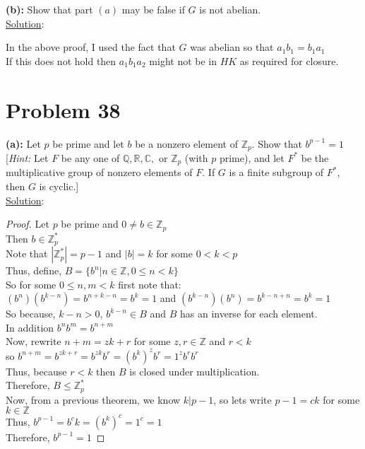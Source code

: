 \documentclass{article} %
\begin{document}
\textbf{(b): } Show that part $(a)$ may be false if $G$ is not abelian.
\\

\underline{Solution}: 
\begin{addmargin}[1em]{0em}
In the above proof, I used the fact that $G$ was abelian so that $a_1b_1 = b_1a_1$
\\If this does not hold then $a_1b_1a_2$ might not be in $HK$ as required for closure.
\end{addmargin} 

\newpage
\section*{Problem 38}


\textbf{(a): } Let $p$ be prime and let $b$ be a nonzero element of $\mathbb{Z}_p$.  Show that $b^{p-1} = 1$ [\textit{Hint:} Let $F$ be any one of $\mathbb{Q}, \mathbb{R}, \mathbb{C},$ or $\mathbb{Z}_p$ (with $p$ prime), and let $F^*$ be the multiplicative group of nonzero elements of $F$.  If $G$ is a finite subgroup of $F^*$, then $G$ is cyclic.]
\\

\underline{Solution}: 
\begin{addmargin}[1em]{0em}
\begin{proof}
Let $p$ be prime and $0 \neq b \in \mathbb{Z}_p$
\\Then $b \in \mathbb{Z}_p^*$
\\Note that $|\mathbb{Z}_p^*| = p - 1$ and $|b| = k$ for some $0 < k < p$
\\Thus, define, $B = \{b^n | n \in \mathbb{Z}, 0 \leq n < k\}$
\\So for some $0 \leq n,m < k$ first note that:
\\$(b^n)(b^{k-n}) = b^{n+k-n} = b^k = 1$ and $(b^{k-n})(b^n) = b^{k-n+n} = b^k = 1$
\\So because, $k-n > 0$, $b^{k-n} \in B$ and $B$ has an inverse for each element.
\\In addition $b^nb^m=b^{n+m}$
\\Now, rewrite $n + m = zk + r$ for some $z,r \in \mathbb{Z}$ and $r < k$
\\so $b^{n+m}=b^{zk+r}=b^{zk}b^r=(b^k)^zb^r=1^zb^rb^r$
\\Thus, because $r < k$ then $B$ is closed under multiplication.
\\Therefore, $B \leq \mathbb{Z}_p^*$
\\Now, from a previous theorem, we know $k|p-1$, so lets write $p-1 = ck$ for some $k \in \mathbb{Z}$
\\Thus, $b^{p-1}=b^ck = (b^k)^c=1^c = 1$
\\Therefore, $b^{p-1}=1$
\end{proof}
\end{addmargin} 
\end{document}

